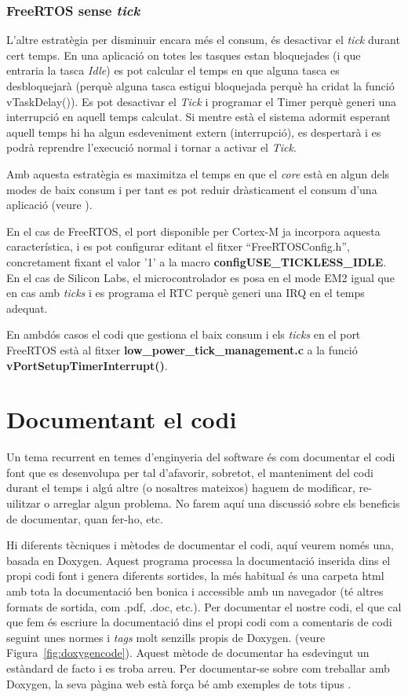 \subsection{FreeRTOS sense {\em tick}}
\label{sub:tickless}

L'altre estratègia per disminuir encara més el consum, és desactivar el {\em tick} durant cert temps. En una aplicació on totes les tasques estan bloquejades (i que entraria la tasca {\em Idle}) es pot calcular el temps en que alguna tasca es desbloquejarà (perquè alguna tasca estigui bloquejada perquè ha cridat la funció vTaskDelay()). Es pot desactivar el {\em Tick} i programar el Timer perquè generi una interrupció en aquell temps calculat. Si mentre està el sistema adormit esperant aquell temps hi ha algun esdeveniment extern (interrupció), es despertarà i es podrà reprendre l'execució normal i tornar a activar el {\em Tick}.

Amb aquesta estratègia es maximitza el temps en que el {\em core} està en algun dels modes de baix consum i per tant es pot reduir dràsticament el consum d'una aplicació (veure ).

En el cas de FreeRTOS, el port disponible per Cortex-M ja incorpora aquesta característica, i es pot configurar editant el fitxer ``FreeRTOSConfig.h'', concretament fixant el valor '1' a la macro {\bf configUSE\_TICKLESS\_IDLE}. En el cas de Silicon Labs, el microcontrolador es posa en el mode EM2 igual que en cas amb {\em ticks} i es programa el RTC perquè generi una \gls{IRQ} en el temps adequat.

En ambdós casos el codi que gestiona el baix consum i els {\em ticks} en el port FreeRTOS està al fitxer {\bf low\_power\_tick\_management.c} a la funció {\bf vPortSetupTimerInterrupt()}.

\chapter{Documentant el codi}
\label{sec:documentant}
Un tema recurrent en temes d'enginyeria del software és com documentar el codi font que es desenvolupa per tal d'afavorir, sobretot, el manteniment del codi durant el temps i algú altre (o nosaltres mateixos) haguem de modificar, re-uilitzar o arreglar algun problema. No farem aquí una discussió sobre els beneficis de documentar, quan fer-ho, etc.

Hi diferents tècniques i mètodes de documentar el codi, aquí veurem només una, basada en Doxygen. Aquest programa processa la documentació inserida dins el propi codi font i genera diferents sortides, la més habitual és una carpeta html amb tota la documentació ben bonica i accessible amb un navegador (té altres formats de sortida, com .pdf, .doc, etc.). Per documentar el nostre codi, el que cal que fem és escriure la documentació dins el propi codi com a comentaris de codi seguint unes normes i {\em tags} molt senzills propis de Doxygen. (veure Figura~\ref{fig:doxygencode}). Aquest mètode de documentar ha esdevingut un estàndard de facto i es troba arreu. Per documentar-se sobre com treballar amb Doxygen, la seva pàgina web està força bé amb exemples de tots tipus \cite{Doxygen}.

